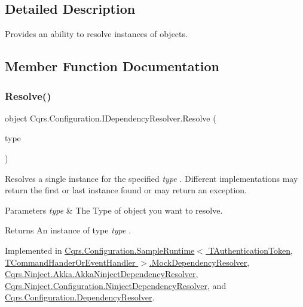 \subsection{Detailed Description}
Provides an ability to resolve instances of objects. 



\subsection{Member Function Documentation}
\mbox{\label{interfaceCqrs_1_1Configuration_1_1IDependencyResolver_aa455096b7b94fc1d64904bc67830ec06_aa455096b7b94fc1d64904bc67830ec06}} 
\subsubsection{\texorpdfstring{Resolve()}{Resolve()}}
{\footnotesize\ttfamily object Cqrs.\+Configuration.\+I\+Dependency\+Resolver.\+Resolve (\begin{DoxyParamCaption}\item[{Type}]{type }\end{DoxyParamCaption})}



Resolves a single instance for the specified {\itshape type} . Different implementations may return the first or last instance found or may return an exception. 


\begin{DoxyParams}{Parameters}
{\em type} & The Type of object you want to resolve.\\
\hline
\end{DoxyParams}
\begin{DoxyReturn}{Returns}
An instance of type {\itshape type} .
\end{DoxyReturn}


Implemented in \hyperlink{classCqrs_1_1Configuration_1_1SampleRuntime_1_1MockDependencyResolver_ac4e52e995e2f8ff243d2af624d229461_ac4e52e995e2f8ff243d2af624d229461}{Cqrs.\+Configuration.\+Sample\+Runtime$<$ T\+Authentication\+Token, T\+Command\+Hander\+Or\+Event\+Handler $>$.\+Mock\+Dependency\+Resolver}, \hyperlink{classCqrs_1_1Ninject_1_1Akka_1_1AkkaNinjectDependencyResolver_adace29de71f10e34e952bd41e48106a6_adace29de71f10e34e952bd41e48106a6}{Cqrs.\+Ninject.\+Akka.\+Akka\+Ninject\+Dependency\+Resolver}, \hyperlink{classCqrs_1_1Ninject_1_1Configuration_1_1NinjectDependencyResolver_ab9da7f1556cc1ef205d03d3ff62017c0_ab9da7f1556cc1ef205d03d3ff62017c0}{Cqrs.\+Ninject.\+Configuration.\+Ninject\+Dependency\+Resolver}, and \hyperlink{classCqrs_1_1Configuration_1_1DependencyResolver_aaeeb3ad2e0ef44bd98469d843210205c_aaeeb3ad2e0ef44bd98469d843210205c}{Cqrs.\+Configuration.\+Dependency\+Resolver}.

